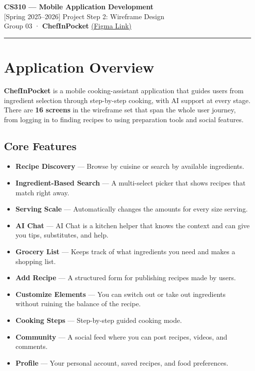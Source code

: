 \documentclass[11pt,a4paper]{article}
\begin{document}
\begin{center}
  {\large\bfseries CS310 — Mobile Application Development}\\[4pt]
  {\large [Spring 2025--2026] Project Step 2: Wireframe Design}\\[4pt]
  {\large Group 03 · \textbf{ChefInPocket} \href{https://www.figma.com/design/F9e3Pw1xHWcjTOXJdUAg6O/CS-310-Wireframe-Screens?node-id=0-1&t=OHfVGml8bY8OPxhA-1}{\textcolor{accent}{(Figma Link)}}}
\end{center}

\medskip
\noindent\textcolor{border}{\rule{\linewidth}{0.4pt}}
\medskip

\section{Application Overview}

\textbf{ChefInPocket} is a mobile cooking-assistant application that guides users from ingredient selection through step-by-step cooking, with AI support at every stage. There are \textbf{16 screens} in the wireframe set that span the whole user journey, from logging in to finding recipes to using preparation tools and social features.

\subsection*{Core Features}
\begin{itemize}
  \item \textbf{Recipe Discovery} — Browse by cuisine or search by available ingredients.
  \item \textbf{Ingredient-Based Search} — A multi-select picker that shows recipes that match right away.
  \item \textbf{Serving Scale} — Automatically changes the amounts for every size serving.
  \item \textbf{AI Chat} — AI Chat is a kitchen helper that knows the context and can give you tips, substitutes, and help.
  \item \textbf{Grocery List} — Keeps track of what ingredients you need and makes a shopping list.
  \item \textbf{Add Recipe} — A structured form for publishing recipes made by users.
  \item \textbf{Customize Elements} — You can switch out or take out ingredients without ruining the balance of the recipe.
  \item \textbf{Cooking Steps} — Step-by-step guided cooking mode.
  \item \textbf{Community} — A social feed where you can post recipes, videos, and comments.
  \item \textbf{Profile} — Your personal account, saved recipes, and food preferences.
\end{itemize}
\end{document}
